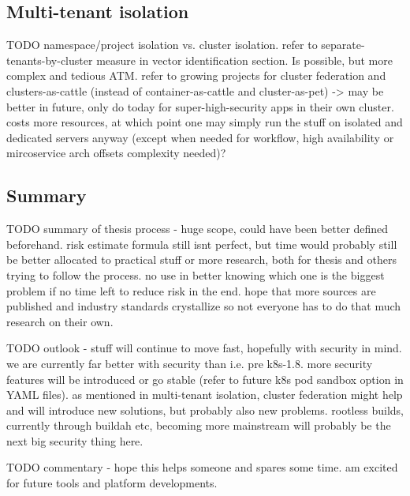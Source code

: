 \subsection{Multi-tenant isolation}

TODO namespace/project isolation vs. cluster isolation. refer to separate-tenants-by-cluster measure in vector identification section. Is possible, but more complex and tedious ATM. refer to growing projects for cluster federation and clusters-as-cattle (instead of container-as-cattle and cluster-as-pet)
-> may be better in future, only do today for super-high-security apps in their own cluster. costs more resources, at which point one may simply run the stuff on isolated and dedicated servers anyway (except when needed for workflow, high availability or mircoservice arch offsets complexity needed)?

\subsection{Summary}

TODO summary of thesis process - huge scope, could have been better defined beforehand. risk estimate formula still isnt perfect, but time would probably still be better allocated to practical stuff or more research, both for thesis and others trying to follow the process. no use in better knowing which one is the biggest problem if no time left to reduce risk in the end. hope that more sources are published and industry standards crystallize so not everyone has to do that much research on their own.

TODO outlook - stuff will continue to move fast, hopefully with security in mind. we are currently far better with security than i.e. pre k8s-1.8. more security features will be introduced or go stable (refer to future k8s pod sandbox option in YAML files). as mentioned in multi-tenant isolation, cluster federation might help and will introduce new solutions, but probably also new problems. rootless builds, currently through buildah etc, becoming more mainstream will probably be the next big security thing here.

TODO commentary - hope this helps someone and spares some time. am excited for future tools and platform developments.
